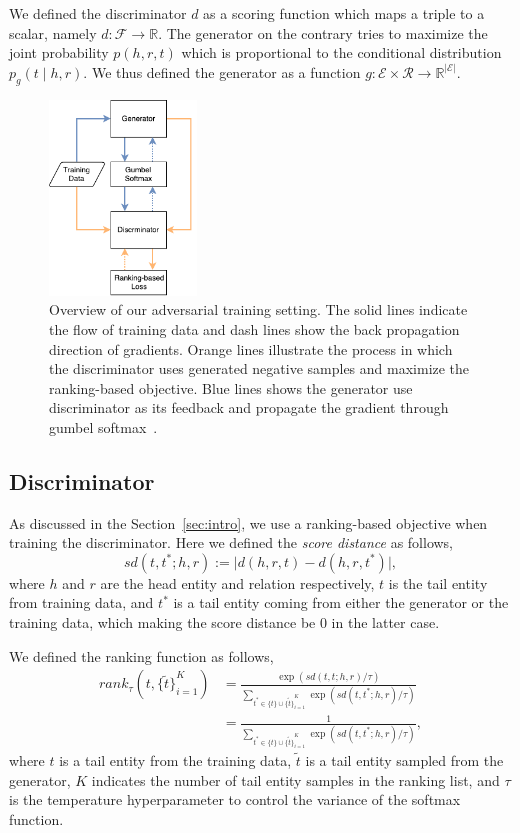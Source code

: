 \documentclass[twocolumn,a4paper,10pt,preprint,3p]{elsarticle}
\begin{document}
We defined the discriminator $d$ as a scoring function which maps a triple to a scalar, namely $d: \mathcal{F}\rightarrow \mathbb{R}$. The generator on the contrary tries to maximize the joint probability $p(h, r, t)$ which is proportional to the conditional distribution $p_g(t \mid h, r)$. We thus defined the generator as a function $g: \mathcal{E} \times \mathcal{R} \rightarrow \mathbb{R}^{\lvert \mathcal{E} \rvert}$.

\begin{figure}[t]
    \centering
    \includegraphics[width=0.35\textwidth]{images/overview.pdf}
    \caption{Overview of our adversarial training setting. The solid lines indicate the flow of training data and dash lines show the back propagation direction of gradients. Orange lines illustrate the process in which the discriminator uses generated negative samples and maximize the ranking-based objective. Blue lines shows the generator use discriminator as its feedback and propagate the gradient through gumbel softmax~\cite{GumbelSoftmax_Jiang_2016}.}
\label{system-overview}
\end{figure}

\subsection{Discriminator}

As discussed in the Section~\ref{sec:intro}, we use a ranking-based objective when training the discriminator. Here we defined the \emph{score distance} as follows,
\[
    sd(t, t^*; h, r) := \lvert d(h, r, t) - d(h, r, t^*) \rvert,
\]
where $h$ and $r$ are the head entity and relation respectively, $t$ is the tail entity from training data, and $t^*$ is a tail entity coming from either the generator or the training data, which making the score distance be 0 in the latter case.

We defined the ranking function as follows,
\begin{align*}
    rank_\tau(t, {\{\tilde t \}}_{i=1}^K)
    &= \frac{\exp(sd(t, t; h, r) / \tau)}
        {\sum_{t^*\in \{t\} \cup {\{\tilde t \}}_{i=1}^K } \exp (sd(t, t^*; h, r) / \tau) } \\
    &= \frac{1}
        {\sum_{t^*\in \{t\} \cup {\{\tilde t \}}_{i=1}^K } \exp (sd(t, t^*; h, r) / \tau) },
\end{align*}
where $t$ is a tail entity from the training data, $\tilde t$ is a tail entity sampled from the generator, $K$ indicates the number of tail entity samples in the ranking list, and $\tau$ is the temperature hyperparameter to control the variance of the softmax function.
\end{document}
